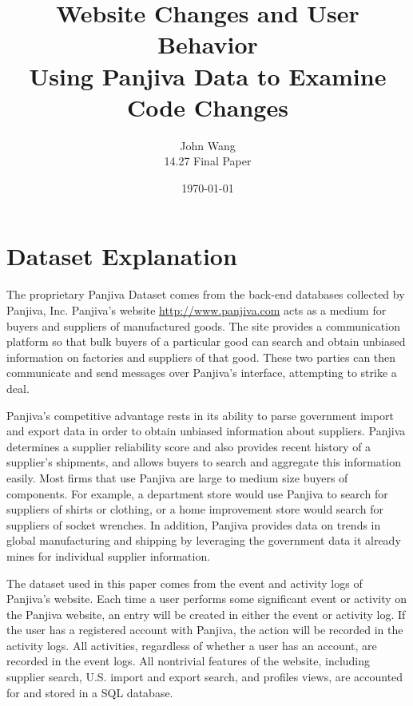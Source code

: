 \documentclass[psamsfonts]{amsart}
\title{Website Changes and User Behavior \\
Using Panjiva Data to Examine Code Changes}
\date{\today}
\author{John Wang \\
14.27 Final Paper}
\begin{document}
\begin{abstract}
\end{abstract}

\maketitle

\tableofcontents

\newpage

\section{Dataset Explanation}

The proprietary Panjiva Dataset comes from the back-end databases collected by Panjiva, Inc. Panjiva's website \url{http://www.panjiva.com} acts as a medium for buyers and suppliers of manufactured goods. The site provides a communication platform so that bulk buyers of a particular good can search and obtain unbiased information on factories and suppliers of that good. These two parties can then communicate and send messages over Panjiva's interface, attempting to strike a deal. 

Panjiva's competitive advantage rests in its ability to parse government import and export data in order to obtain unbiased information about suppliers. Panjiva determines a supplier reliability score and also provides recent history of a supplier's shipments, and allows buyers to search and aggregate this information easily. Most firms that use Panjiva are large to medium size buyers of components. For example, a department store would use Panjiva to search for suppliers of shirts or clothing, or a home improvement store would search for suppliers of socket wrenches. In addition, Panjiva provides data on trends in global manufacturing and shipping by leveraging the government data it already mines for individual supplier information.

The dataset used in this paper comes from the event and activity logs of Panjiva's website. Each time a user performs some significant event or activity on the Panjiva website, an entry will be created in either the event or activity log. If the user has a registered account with Panjiva, the action will be recorded in the activity logs. All activities, regardless of whether a user has an account, are recorded in the event logs. All nontrivial features of the website, including supplier search, U.S. import and export search, and profiles views, are accounted for and stored in a SQL database.
\end{document}
